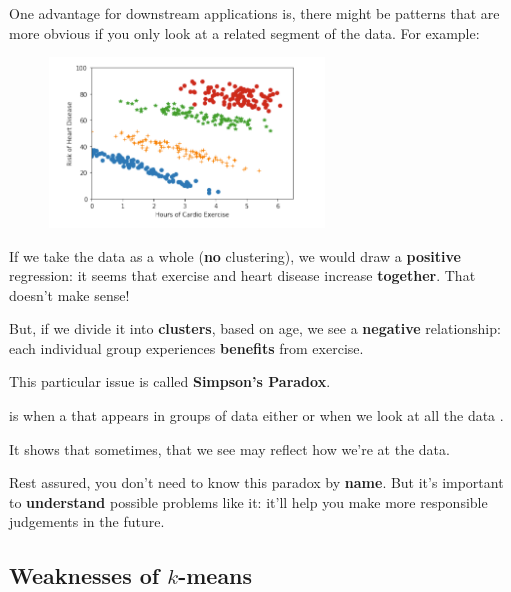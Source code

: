         One advantage for downstream applications is, there might be patterns that are more obvious if you only look at a related segment of the data. For example:
        
        \begin{figure}[h]
            \centering
            \includegraphics[width=0.65\textwidth]{images/clustering_images/simpsons_problem.png}
        \end{figure}
        
        If we take the data as a whole (\textbf{no} clustering), we would draw a \textbf{positive} regression: it seems that exercise and heart disease increase \textbf{together}. That doesn't make sense!
        
        But, if we divide it into \textbf{clusters}, based on age, we see a \textbf{negative} relationship: each individual group experiences \textbf{benefits} from exercise.
        
        This particular issue is called \textbf{Simpson's Paradox}.\\
        
        \begin{definition}
             is when a  that appears in groups of data either  or  when we look at all the data .
            
            It shows that sometimes,  that we see may reflect how we're  at the data.
        \end{definition}
        
        Rest assured, you don't need to know this paradox by \textbf{name}. But it's important to \textbf{understand} possible problems like it: it'll help you make more responsible judgements in the future.
        
    \subsection{Weaknesses of $k$-means}
    
